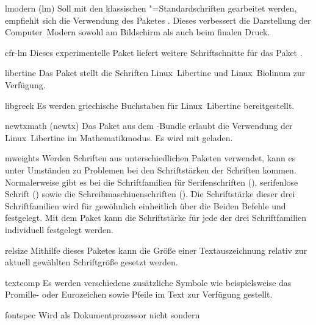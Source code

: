 \begin{packages}
\item[lmodern](lm)
  Soll mit den klassischen "=Standardschriften gearbeitet werden, 
  empfiehlt sich die Verwendung des Paketes . Dieses 
  verbessert die Darstellung der Computer~Modern sowohl am Bildschirm als auch 
  beim finalen Druck.
\item[cfr-lm]
  Dieses experimentelle Paket liefert weitere Schriftschnitte für das Paket 
  .
\item[libertine]
  Das Paket stellt die Schriften Linux~Libertine und Linux~Biolinum zur 
  Verfügung.
  \begin{packages}
    \item[libgreek]
      Es werden griechische Buchstaben für Linux~Libertine bereitgestellt.
    \item[newtxmath](newtx)
      Das Paket aus dem -Bundle erlaubt die Verwendung der 
      Linux~Libertine im Mathematikmodus. Es wird mit
       geladen.
  \end{packages}
\item[mweights]
  Werden Schriften aus unterschiedlichen Paketen verwendet, kann es unter 
  Umständen zu Problemen bei den Schriftstärken der Schriften kommen. 
  Normalerweise gibt es bei  die Schriftfamilien für 
  Serifenschriften (), serifenlose Schrift () 
  sowie die Schreibmaschinenschriften (). Die Schriftstärke 
  dieser drei Schriftfamilien wird für gewöhnlich einheitlich über die Beiden 
  Befehle  und  festgelegt. Mit dem Paket 
   kann die Schriftstärke für jede der drei Schriftfamilien 
  individuell festgelegt werden.
\item[relsize]
  Mithilfe dieses Paketes kann die Größe einer Textauszeichnung relativ zur 
  aktuell gewählten Schriftgröße gesetzt werden.
\item[textcomp]
  Es werden verschiedene zusätzliche Symbole wie beispielsweise das Promille- 
  oder Eurozeichen sowie Pfeile im Text zur Verfügung gestellt.
\item[fontspec]
  Wird als Dokumentprozessor nicht  sondern  

\end{packages}

